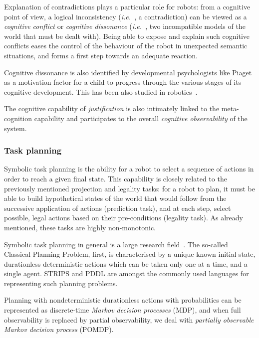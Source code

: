 \documentclass[a4paper, twocolumn]{article}
\newcommand{\ie}{{\textit{i.e.\ }}}
\begin{document}
Explanation of contradictions plays a particular role for robots: from a
cognitive point of view, a logical inconsistency (\ie, a contradiction) can be
viewed as a \emph{cognitive conflict} or \emph{cognitive dissonance} (\ie, two
incompatible models of the world that must be dealt with). Being able to expose
and explain such cognitive conflicts eases the control of the behaviour of the
robot in unexpected semantic situations, and forms a first step towards an
adequate reaction.

Cognitive dissonance is also identified by developmental psychologists like
Piaget as a motivation factor for a child to progress through the various
stages of its cognitive development. This has been also studied in
robotics~\cite{Oudeyer2007}.

The cognitive capability of \emph{justification} is also intimately linked to
the meta-cognition capability and participates to the overall \emph{cognitive
observability} of the system.

\subsubsection{Task planning}
\label{sect|planning}

Symbolic task planning is the ability for a robot to select a sequence of
actions in order to reach a given final state. This capability is closely
related to the previously mentioned projection and legality tasks: for a robot
to plan, it must be able to build hypothetical states of the world that would
follow from the successive application of actions (prediction task), and at
each step, select possible, legal actions based on their pre-conditions
(legality task). As already mentioned, these tasks are highly non-monotonic.


Symbolic task planning in general is a large research
field~\cite{Russell2009planning}. The so-called Classical Planning Problem,
first, is characterised by a unique known initial state, durationless
deterministic actions which can be taken only one at a time, and a single
agent. STRIPS and PDDL are amongst the commonly used languages for representing
such planning problems.

Planning with nondeterministic durationless actions with probabilities can be
represented as discrete-time \emph{Markov decision processes} (MDP), and when
full observability is replaced by partial observability, we deal with
\emph{partially observable Markov decision process} (POMDP).
\end{document}
